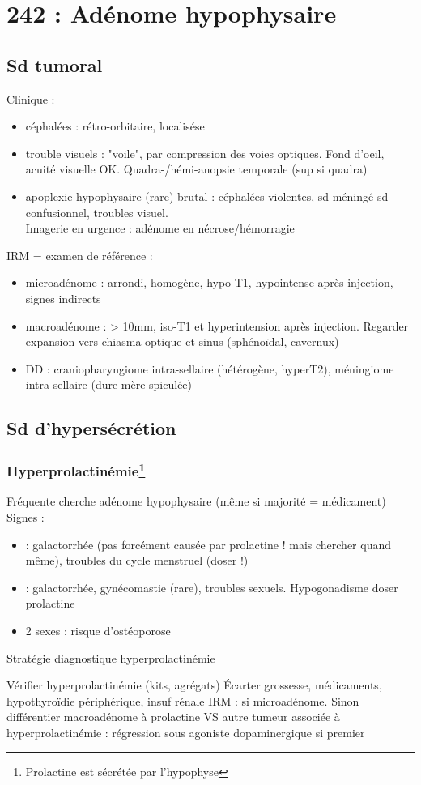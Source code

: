 \documentclass[11pt]{article}
\begin{document}
\section{242 : Adénome hypophysaire}
\label{sec:orgbc32dd5}
\subsection{Sd tumoral}
\label{sec:org01ad66d}
Clinique : 
\begin{itemize}
\item céphalées : rétro-orbitaire, localisése
\item trouble visuels : "voile", par compression des voies optiques. Fond d'oeil,
acuité visuelle OK. Quadra-/hémi-anopsie temporale (sup si quadra)
\item apoplexie hypophysaire (rare) brutal : céphalées violentes, sd méningé sd
 confusionnel, troubles visuel.\\
Imagerie en urgence \danger : adénome en nécrose/hémorragie \skull
\end{itemize}

IRM = examen de référence :
\begin{itemize}
\item microadénome : arrondi, homogène, hypo-T1, hypointense  après injection,
signes indirects
\item macroadénome :  > 10mm, iso-T1 et hyperintension après injection. Regarder
expansion vers chiasma optique et sinus (sphénoïdal, cavernux)
\item DD : craniopharyngiome intra-sellaire (hétérogène, hyperT2), méningiome
intra-sellaire (dure-mère spiculée)
\end{itemize}

\subsection{Sd d'hypersécrétion}
\label{sec:orgfa7d50a}
\subsubsection{Hyperprolactinémie\footnote{Prolactine est sécrétée par l'hypophyse}}
\label{sec:orgb762f9c}
Fréquente \thus cherche adénome hypophysaire (même si majorité = médicament)
Signes :
\begin{itemize}
\item \female : galactorrhée (pas forcément causée par prolactine ! mais chercher
quand même), troubles du cycle menstruel (doser !)
\item \male : galactorrhée, gynécomastie (rare), troubles sexuels. Hypogonadisme
\thus doser prolactine
\item 2 sexes : risque d'ostéoporose
\end{itemize}
\begin{algorithm}
  \caption{Stratégie diagnostique hyperprolactinémie} 
  Vérifier hyperprolactinémie (kits, agrégats)\;
  Écarter grossesse, médicaments, hypothyroïdie périphérique, insuf rénale\;
  IRM : si microadénome. \;
  Sinon différentier macroadénome à prolactine VS autre tumeur associée à 
hyperprolactinémie : régression sous agoniste dopaminergique si premier\;
\end{algorithm}
\end{document}
